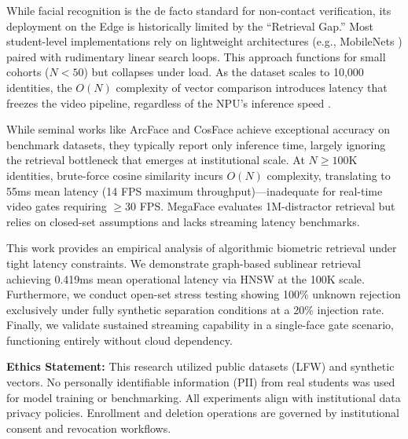 \documentclass[conference]{IEEEtran}
\begin{document}
While facial recognition is the de facto standard for non-contact verification, its deployment on the Edge is historically limited by the ``Retrieval Gap.'' Most student-level implementations rely on lightweight architectures (e.g., MobileNets \cite{b4}) paired with rudimentary linear search loops. This approach functions for small cohorts ($N < 50$) but collapses under load. As the dataset scales to 10,000 identities, the $O(N)$ complexity of vector comparison introduces latency that freezes the video pipeline, regardless of the NPU's inference speed \cite{b2}.

While seminal works like ArcFace and CosFace achieve exceptional accuracy on benchmark datasets, they typically report only inference time, largely ignoring the retrieval bottleneck that emerges at institutional scale. At $N \ge 100$K identities, brute-force cosine similarity incurs $O(N)$ complexity, translating to 55ms mean latency (14 FPS maximum throughput)—inadequate for real-time video gates requiring $\ge$30 FPS. MegaFace evaluates 1M-distractor retrieval but relies on closed-set assumptions and lacks streaming latency benchmarks. 

This work provides an empirical analysis of algorithmic biometric retrieval under tight latency constraints. We demonstrate graph-based sublinear retrieval achieving 0.419ms mean operational latency via HNSW at the 100K scale. Furthermore, we conduct open-set stress testing showing 100\% unknown rejection exclusively under fully synthetic separation conditions at a 20\% injection rate. Finally, we validate sustained streaming capability in a single-face gate scenario, functioning entirely without cloud dependency.

\textbf{Ethics Statement:} This research utilized public datasets (LFW) and synthetic vectors. No personally identifiable information (PII) from real students was used for model training or benchmarking. All experiments align with institutional data privacy policies. Enrollment and deletion operations are governed by institutional consent and revocation workflows.
\end{document}
